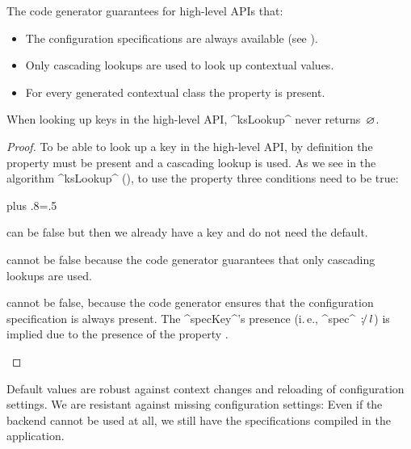 The code generator  guarantees for high-level APIs that:
\begin{itemize}
\item The configuration specifications are always available (see ).
\item Only cascading lookups are used to look up contextual values.
\item For every generated contextual class the property  is present.
\end{itemize}

\begin{lemma}
When looking up keys in the high-level API, ^ksLookup^ never returns~$\NullKey$.
\end{lemma}

\begin{proof}
To be able to look up a key in the high-level API, by definition the property  must be present and a cascading lookup is used.
As we see in the algorithm ^ksLookup^ (), to use the property  three conditions need to be true:%
{\parfillskip=0pt plus .8\textwidth \emergencystretch=.5\textwidth \par}
\begin{description}[font=\normalfont\ttfamily]
\item[k == $\NullKey$:] can be false but then we already have a key and do not need the default.
\item[l \textbf{\color{BlueViolet}{is of namespace}} $\EmptyNameSpace$:] cannot be false because the code generator guarantees that only cascading lookups are used.
\item[specKey != $\NullKey$:] cannot be false, because the code generator ensures that the configuration specification is always present.
The ^specKey^'s presence (i.\,e., ^spec^ $\operatorname*{\mathnormal{\colon\!\!\!/}} l$) is implied due to the presence of the property .
\end{description}
\end{proof}

Default values are robust against context changes and reloading of configuration settings.
We are resistant against missing configuration settings:
Even if the backend cannot be used at all, we still have the specifications compiled in the application.

